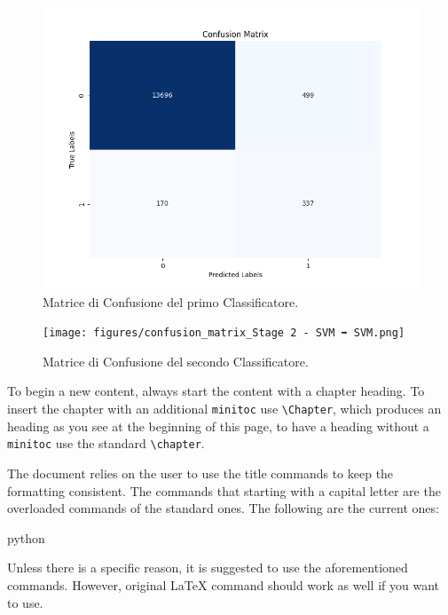 \documentclass[minted, draw]{../tex/hebdomon}
\begin{document}
% 
\begin{figure}[H]
  \centering
  \includegraphics[width=.8\linewidth]{figures/confusion_matrix_Stage 1 - SVM.png}
  \caption{Matrice di Confusione del primo Classificatore.}
  \label{fig:confusion_1}
\end{figure}
% 
\begin{figure}[H]
  \centering
  \texttt{[image: figures/confusion\_matrix\_Stage 2 - SVM ➡ SVM.png]}
  \caption{Matrice di Confusione del secondo Classificatore.}
  \label{fig:confusion_2}
\end{figure}
%









\iffalse

To begin a new content, always start the content with a chapter heading. To
insert the chapter with an additional \lstinline[columns=fixed]{minitoc}
use \lstinline[columns=fixed]{\Chapter}, which produces an heading as
you see at the beginning of this page, to have a heading without
a \lstinline[columns=fixed]{minitoc} use the standard
\lstinline[columns=fixed]{\chapter}.

The document relies on the user to use the  title commands to
keep the formatting consistent. The commands that starting with a
capital letter are the overloaded commands of the standard ones.
The following are the current ones:
%
\begin{code}{python}
\end{code}
%
\begin{warning}
	Unless there is a specific reason, it is suggested to use the aforementioned
	commands. However, original LaTeX command should work as well if you want to use.
\end{warning}
\end{document}
